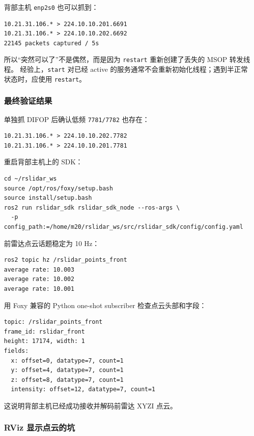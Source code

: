 \documentclass[UTF8,11pt,a4paper]{ctexart}
\begin{document}
背部主机 \texttt{enp2s0} 也可以抓到：

\begin{verbatim}
10.21.31.106.* > 224.10.10.201.6691
10.21.31.106.* > 224.10.10.202.6692
22145 packets captured / 5s
\end{verbatim}

所以“突然可以了”不是偶然，而是因为 \texttt{restart} 重新创建了丢失的 MSOP 转发线程。
经验上，\texttt{start} 对已经 active 的服务通常不会重新初始化线程；遇到半正常状态时，应使用 \texttt{restart}。

\subsubsection{最终验证结果}

单独抓 DIFOP 后确认低频 \texttt{7781/7782} 也存在：

\begin{verbatim}
10.21.31.106.* > 224.10.10.202.7782
10.21.31.106.* > 224.10.10.201.7781
\end{verbatim}

重启背部主机上的 SDK：

\begin{verbatim}
cd ~/rslidar_ws
source /opt/ros/foxy/setup.bash
source install/setup.bash
ros2 run rslidar_sdk rslidar_sdk_node --ros-args \
  -p config_path:=/home/m20/rslidar_ws/src/rslidar_sdk/config/config.yaml
\end{verbatim}

前雷达点云话题稳定为 10 Hz：

\begin{verbatim}
ros2 topic hz /rslidar_points_front
average rate: 10.003
average rate: 10.002
average rate: 10.001
\end{verbatim}

用 Foxy 兼容的 Python one-shot subscriber 检查点云头部和字段：

\begin{verbatim}
topic: /rslidar_points_front
frame_id: rslidar_front
height: 17174, width: 1
fields:
  x: offset=0, datatype=7, count=1
  y: offset=4, datatype=7, count=1
  z: offset=8, datatype=7, count=1
  intensity: offset=12, datatype=7, count=1
\end{verbatim}

这说明背部主机已经成功接收并解码前雷达 XYZI 点云。

\subsubsection{RViz 显示点云的坑}
\end{document}

